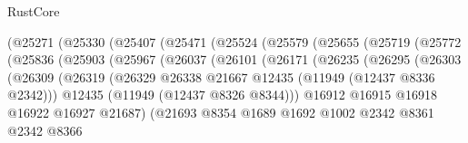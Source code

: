 \begin{lexlean}{RustCore}
\begin{coremodule}
                        (@25271
                          (@25330
                            (@25407
                              (@25471
                                (@25524
                                  (@25579
                                    (@25655
                                      (@25719
                                        (@25772
                                          (@25836
                                            (@25903
                                              (@25967
                                                (@26037
                                                  (@26101
                                                    (@26171
                                                      (@26235
                                                        (@26295
                                                          (@26303
                                                            (@26309
                                                              (@26319
                                                                (@26329
                                                                  @26338
                                                                  @21667
                                                                  @12435
                                                                  (@11949 (@12437 @8336 @2342)))
                                                                @12435
                                                                (@11949 (@12437 @8326 @8344)))
                                                              @16912
                                                              @16915
                                                              @16918
                                                              @16922
                                                              @16927
                                                              @21687)
                                                            (@21693
                                                              @8354
                                                              @1689
                                                              @1692
                                                              @1002
                                                              @2342
                                                              @8361
                                                              @2342
                                                              @8366

\end{coremodule}
\end{lexlean}
